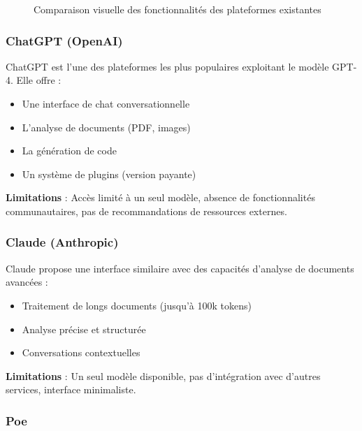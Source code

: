 \begin{figure}[H]
    \centering
    \caption{Comparaison visuelle des fonctionnalités des plateformes existantes}
    \label{fig:comparaison-plateformes}
\end{figure}

\subsubsection{ChatGPT (OpenAI)}

ChatGPT est l'une des plateformes les plus populaires exploitant le modèle GPT-4. Elle offre :
\begin{itemize}
    \item Une interface de chat conversationnelle
    \item L'analyse de documents (PDF, images)
    \item La génération de code
    \item Un système de plugins (version payante)
\end{itemize}

\textbf{Limitations} : Accès limité à un seul modèle, absence de fonctionnalités communautaires, pas de recommandations de ressources externes.

\subsubsection{Claude (Anthropic)}

Claude propose une interface similaire avec des capacités d'analyse de documents avancées :
\begin{itemize}
    \item Traitement de longs documents (jusqu'à 100k tokens)
    \item Analyse précise et structurée
    \item Conversations contextuelles
\end{itemize}

\textbf{Limitations} : Un seul modèle disponible, pas d'intégration avec d'autres services, interface minimaliste.

\subsubsection{Poe}

